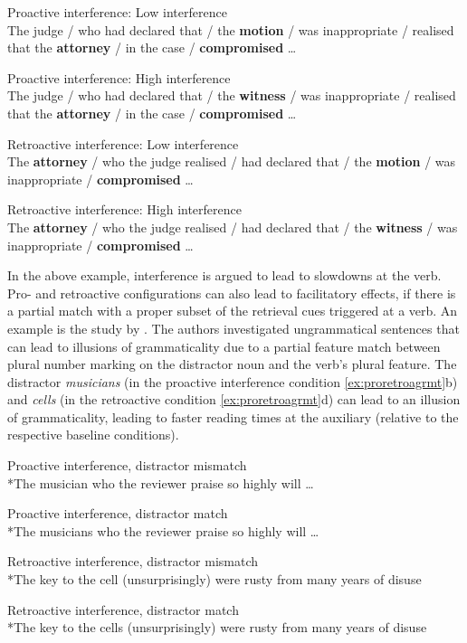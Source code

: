 \documentclass{cambridge7A}\usepackage[]{graphicx}\usepackage[]{color}
\begin{document}
\begin{exe}
\ex \label{ex:proretrovandyke2011}
\begin{xlist}
\item Proactive interference: Low interference\\
The judge / who had declared that / the \textbf{motion} / was inappropriate / realised that the \textbf{attorney} / in the case / \textbf{compromised} \dots
\item Proactive interference: High interference\\
The judge / who had declared that / the \textbf{witness} / was inappropriate / realised that the \textbf{attorney} / in the case / \textbf{compromised} \dots
\item Retroactive interference: Low interference \\
The \textbf{attorney} / who the judge realised / had declared that / the \textbf{motion} / was inappropriate / \textbf{compromised} \dots
\item Retroactive interference: High interference \\
The \textbf{attorney} / who the judge realised / had declared that / the \textbf{witness} / was inappropriate / \textbf{compromised} \dots
\end{xlist}
\end{exe}

In the above example, interference is argued to lead to slowdowns at the verb.
Pro- and retroactive configurations can also lead to facilitatory effects, if there is a partial match with a proper subset of the retrieval cues triggered at a verb.  An example is the study by \cite{WagersLauPhillips2009}. The authors investigated ungrammatical sentences that can lead to illusions of grammaticality due to a partial feature match between plural number marking on the distractor noun and the verb's plural feature.
The distractor \textit{musicians} (in the proactive interference condition \ref{ex:proretroagrmt}b) and \textit{cells} (in the retroactive condition \ref{ex:proretroagrmt}d) can lead to an illusion of grammaticality, leading to faster reading times at the auxiliary (relative to the respective baseline conditions).

\begin{exe}
\ex \label{ex:proretroagrmt}
\begin{xlist}
\item Proactive interference, distractor mismatch\\
*The musician who the reviewer praise so highly will \dots
\item Proactive interference, distractor match\\
*The musicians who the reviewer praise so highly will \dots
\item Retroactive interference, distractor mismatch\\
*The key to the cell (unsurprisingly) were rusty from many years of disuse 
\item Retroactive interference, distractor match\\
*The key to the cells (unsurprisingly) were rusty from many years of disuse
\end{xlist}
\end{exe}
\end{document}
